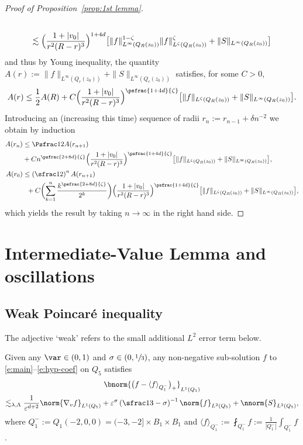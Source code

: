 \begin{proof}[Proof of Proposition~\ref{prop:1st lemma}]
\begin{multline*}
\\
\lesssim \Bigl( \frac{1+|v_0|}{r^2(R-r)^3}
\Bigr)^{1+4d} \bigl[ \|f\|_{L^\infty(Q_R(z_0))}^{1-\zeta}
\|f\|_{L^\zeta(Q_R(z_0))}^\zeta +
\|S\|_{L^\infty(Q_R(z_0))}\bigr]
\end{multline*}
and thus by Young inequality, the quantity $A(r) :=
\|f\|_{L^\infty(Q_r(z_0))} + \|S\|_{L^\infty(Q_r(z_0))}$ satisfies,
for some $C>0$,
\begin{align*}
A(r) \le \frac12 A(R) + C \Bigl( \frac{1+|v_0|}{r^2(R-r)^3}
\Bigr)^{\psfrac{1+4d}{\zeta}} \bigl[ \|f\|_{L^\zeta(Q_R(z_0))} +
\|S\|_{L^\infty(Q_R(z_0))}\bigr].
\end{align*}
Introducing an (increasing this time) sequence of radii
$r_n := r_{n-1} + \delta n^{-2}$ we obtain by induction
\begin{align*}
A(r_n) &\le \Psfrac12 A(r_{n+1})\\
& + C n^{\psfrac{2+8d}{\zeta}}
\Bigl( \frac{1+|v_0|}{r^2(R-r)^3}
\Bigr)^{\psfrac{1+4d}{\zeta}} \bigl[ \|f\|_{L^\zeta(Q_R(z_0))} +
\|S\|_{L^\infty(Q_R(z_0))} \bigr], \\
A(r_0) &\le \left( \sfrac12 \right)^n A(r_{n+1}) \\
& \hspace{2mm}+
C \biggl( \sum_{k=1}^n \frac{k^{\psfrac{2+8d}{\zeta}}}{2^k} \biggr)
\Bigl( \frac{1+|v_0|}{r^2(R-r)^3}
\Bigr)^{\psfrac{1+4d}{\zeta}} \bigl[ \|f\|_{L^\zeta(Q_R(z_0))} +
\|S\|_{L^\infty(Q_R(z_0))}\bigr],
\end{align*}
which yields the result by taking $n \to \infty$ in the right
hand side.
\end{proof}

\section{Intermediate-Value Lemma and oscillations}

\subsection{Weak Poincaré inequality}

The adjective `weak' refers to the small additional $L^2$ error
term below.

\begin{proposition}
\label{p:HPI lemma}
Given any $\var\in (0,1)$ and $\sigma \in (0,\sfrac13)$, any
non-negative sub-solution $f$ to
\eqref{e:main}--\eqref{e:hyp-coef} on $Q_5$ satisfies
\begin{multline}
\label{HPI inequality}
\bnorm{\bigl(f-\langle f
\rangle_{Q_1^{-}} \bigr)_+}_{L^{1}(Q_1)}\\
\lesssim_{\lambda,\Lambda}
\frac{1}{\varepsilon^{d+2}} \norm{\nabla_v f}_{L^1 (Q_5)}
+ \varepsilon^\sigma \left(
\sfrac13 - \sigma \right)^{-1} \norm{f}_{L^2(Q_5)} +
\nnorm{S}_{L^2(Q_5)},
\end{multline}
where $Q_1^- := Q_1(-2,0,0) = (-3,-2] \times B_1 \times B_1$
and
$\langle f \rangle_{Q_1^{-}} := \fint_{Q_1^-} f :=
\frac{1}{|Q_1^-|} \int_{Q_1^-} f$.
\end{proposition}

